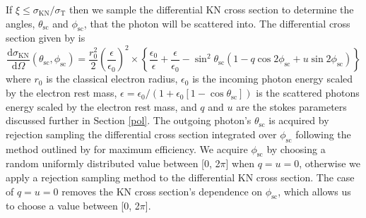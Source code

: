 \documentclass[12pt,a4paper]{article}
\begin{document}
If $\xi \le \sigma_{\mathrm{KN}}/\sigma_{\mathrm{T}}$ then we sample the differential KN cross section to determine the angles, $\theta_{\mathrm{sc}}$ and $\phi_{\mathrm{sc}}$, that the photon will be scattered into. The differential cross section given by \cite{lundman2014polarization} is
\begin{equation}
\frac{\mathrm{d} \sigma_{\mathrm{KN}}}{\mathrm{d} \Omega} (\theta_{\mathrm{sc}}, \phi_{\mathrm{sc}}) =\frac{r_{0}^{2}}{2}\left(\frac{\epsilon}{\epsilon_{0}}\right)^{2} \times 
\left\{\frac{\epsilon_{0}}{\epsilon}+\frac{\epsilon}{\epsilon_{0}} - \sin ^{2} \theta_{\mathrm{sc}}\left(1- q \cos 2 \phi_{\mathrm{sc}}+u \sin 2 \phi_{\mathrm{sc}}\right)\right\} \label{KN_diff_cross_section_scatt}
\end{equation}
where $r_{0}$ is the classical electron radius, $\epsilon_{0}$ is the incoming photon energy scaled by the electron rest mass, $\epsilon=\epsilon_{0}/(1+\epsilon_{0}[1-\cos \theta_{\mathrm{sc}}])$ is the scattered photons energy scaled by the electron rest mass, and $q$ and $u$ are the stokes parameters discussed further in Section \ref{pol}. The outgoing photon's $\theta_{\mathrm{sc}}$ is acquired by rejection sampling the differential cross section integrated over $\phi_{\mathrm{sc}}$ following the method outlined by \cite{sample_kn_theta} for maximum efficiency. We acquire $\phi_{\mathrm{sc}}$ by choosing a random uniformly distributed value between [0, 2$\pi$] when $q=u=0$, otherwise we apply a rejection sampling method to the differential KN cross section. {The case of $q=u=0$ removes the KN cross section's  dependence on $\phi_{\mathrm{sc}}$, which allows us to choose a value between [0, 2$\pi$].}
\end{document}
